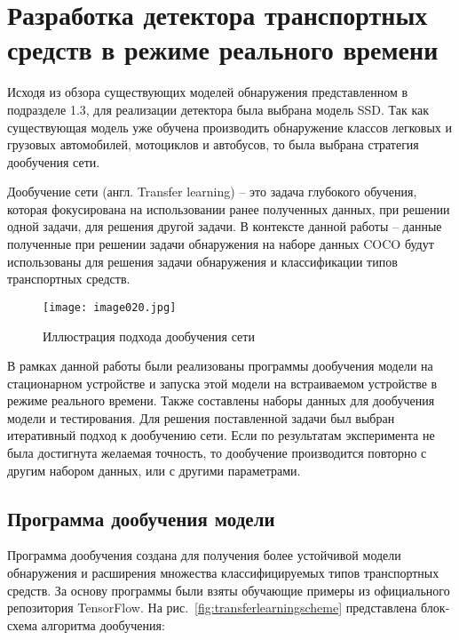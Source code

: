 \chapter{Разработка детектора транспортных средств в режиме реального времени}

Исходя из обзора существующих моделей обнаружения представленном в подразделе 1.3, для реализации детектора была выбрана модель SSD. Так как существующая модель уже обучена производить обнаружение классов легковых и грузовых автомобилей, мотоциклов и автобусов, то была выбрана стратегия дообучения сети. 

Дообучение сети (англ. Transfer learning) – это задача глубокого обучения, которая фокусирована на использовании ранее полученных данных, при решении одной задачи, для решения другой задачи. В контексте данной работы – данные полученные при решении задачи обнаружения на наборе данных COCO будут использованы для решения задачи обнаружения и классификации типов транспортных средств.

\begin{figure}[htbp]
\centering
\texttt{[image: image020.jpg]}
\caption{Иллюстрация подхода дообучения сети}%
\label{fig:how-to-do-research}
\end{figure}

В рамках данной работы были реализованы программы дообучения модели на стационарном устройстве и запуска этой модели на встраиваемом устройстве в режиме реального времени. Также составлены наборы данных для дообучения модели и тестирования. Для решения поставленной задачи был выбран итеративный подход к дообучению сети. Если по результатам эксперимента не была достигнута желаемая точность, то дообучение производится повторно с другим набором данных, или с другими параметрами. 

\section{Программа дообучения модели}

Программа дообучения создана для получения более устойчивой модели обнаружения и расширения множества классифицируемых типов транспортных средств. За основу программы были взяты обучающие примеры из официального репозитория TensorFlow\cite{seventeen}. На рис.~\ref{fig:transferlearningscheme} представлена блок-схема алгоритма дообучения:

